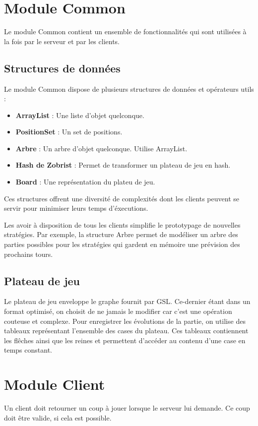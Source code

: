 \documentclass{article}
\begin{document}
\section{Module Common}
Le module Common contient un ensemble de fonctionnalités qui sont 
utilisées à la fois par le serveur et par les clients. 

\subsection{Structures de données}
Le module Common dispose de plusieurs structures de données et opérateurs utils :
\begin{itemize}
    \item \textbf{ArrayList} : Une liste d'objet quelconque.
    \item \textbf{PositionSet} : Un set de positions.
    \item \textbf{Arbre} : Un arbre d'objet quelconque. Utilise ArrayList.
    \item \textbf{Hash de Zobrist} : Permet de transformer un plateau de jeu en hash.
    \item \textbf{Board} : Une représentation du plateu de jeu.
\end{itemize}

Ces structures offrent une diversité de complexités dont les clients 
peuvent se servir pour minimiser leurs temps d'éxecutions.

Les avoir à disposition de tous les clients simplifie le prototypage de nouvelles stratégies.
Par exemple, la structure Arbre permet de modéliser un arbre des parties possibles pour les 
stratégies qui gardent en mémoire une prévision des prochains tours.

\subsection{Plateau de jeu}
Le plateau de jeu enveloppe le graphe fournit par GSL.
Ce-dernier étant dans un format optimisé, on choisit de ne jamais 
le modifier car c'est une opération couteuse et complexe. Pour 
enregistrer les évolutions de la partie, on utilise des 
tableaux représentant l'ensemble des cases du plateau.
Ces tableaux contiennent les flêches ainsi que les reines 
et permettent d'accéder au contenu d'une case en temps constant.


\section{Module Client}
Un client doit retourner un coup à jouer lorsque le serveur lui demande.
Ce coup doit être valide, si cela est possible.
\end{document}

